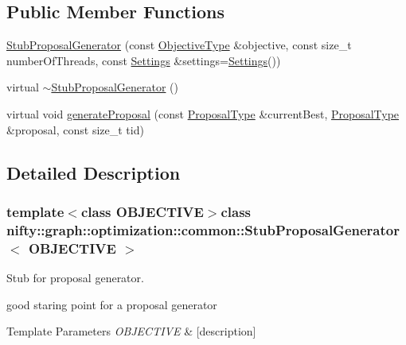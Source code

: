 \subsection*{Public Member Functions}
\begin{DoxyCompactItemize}
\item 
\hyperlink{classnifty_1_1graph_1_1optimization_1_1common_1_1StubProposalGenerator_ab69bf877bbd140cf6373e639a82ef3f8}{Stub\+Proposal\+Generator} (const \hyperlink{classnifty_1_1graph_1_1optimization_1_1common_1_1StubProposalGenerator_ae7d0ffc1c09e62f40d0dbee2ae7ae5d7}{Objective\+Type} \&objective, const size\+\_\+t number\+Of\+Threads, const \hyperlink{structnifty_1_1graph_1_1optimization_1_1common_1_1StubProposalGenerator_1_1Settings}{Settings} \&settings=\hyperlink{structnifty_1_1graph_1_1optimization_1_1common_1_1StubProposalGenerator_1_1Settings}{Settings}())
\item 
virtual \hyperlink{classnifty_1_1graph_1_1optimization_1_1common_1_1StubProposalGenerator_abe642679e1bc368912c451bcac8bfe80}{$\sim$\+Stub\+Proposal\+Generator} ()
\item 
virtual void \hyperlink{classnifty_1_1graph_1_1optimization_1_1common_1_1StubProposalGenerator_ab8e44457d2c33326221b2291e4ff0246}{generate\+Proposal} (const \hyperlink{classnifty_1_1graph_1_1optimization_1_1common_1_1ProposalGeneratorBase_a4700eb43beb708a77c5c34612039c715}{Proposal\+Type} \&current\+Best, \hyperlink{classnifty_1_1graph_1_1optimization_1_1common_1_1ProposalGeneratorBase_a4700eb43beb708a77c5c34612039c715}{Proposal\+Type} \&proposal, const size\+\_\+t tid)
\end{DoxyCompactItemize}


\subsection{Detailed Description}
\subsubsection*{template$<$class O\+B\+J\+E\+C\+T\+I\+V\+E$>$class nifty\+::graph\+::optimization\+::common\+::\+Stub\+Proposal\+Generator$<$ O\+B\+J\+E\+C\+T\+I\+V\+E $>$}

Stub for proposal generator. 

good staring point for a proposal generator


\begin{DoxyTemplParams}{Template Parameters}
{\em O\+B\+J\+E\+C\+T\+I\+V\+E} & \mbox{[}description\mbox{]} \\
\hline
\end{DoxyTemplParams}


